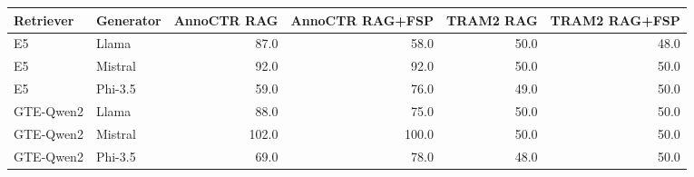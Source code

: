 \begin{tabular}{llrrrr}
\toprule
Retriever & Generator & AnnoCTR RAG & AnnoCTR RAG+FSP & TRAM2 RAG & TRAM2 RAG+FSP \\
\midrule
E5 & Llama & 87.0 & 58.0 & 50.0 & 48.0 \\
E5 & Mistral & 92.0 & 92.0 & 50.0 & 50.0 \\
E5 & Phi-3.5 & 59.0 & 76.0 & 49.0 & 50.0 \\
GTE-Qwen2 & Llama & 88.0 & 75.0 & 50.0 & 50.0 \\
GTE-Qwen2 & Mistral & 102.0 & 100.0 & 50.0 & 50.0 \\
GTE-Qwen2 & Phi-3.5 & 69.0 & 78.0 & 48.0 & 50.0 \\
\bottomrule
\end{tabular}